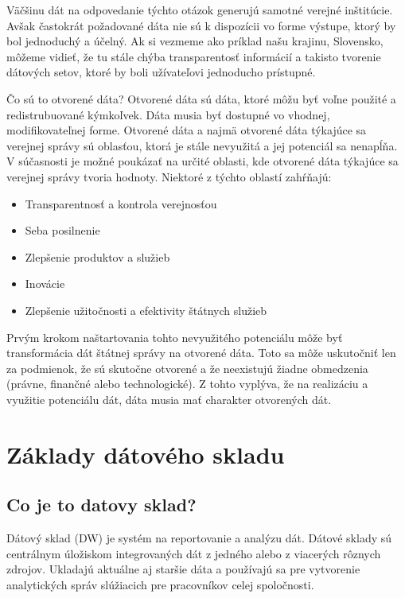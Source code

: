 \documentclass[letterpaper,12pt,oneside]{sphinxmanual}
\begin{document}
Väčšinu dát na odpovedanie týchto otázok generujú samotné verejné inštitúcie. Avšak častokrát požadované
dáta nie sú k dispozícii vo forme výstupe, ktorý by bol jednoduchý a účelný. Ak si vezmeme ako príklad našu krajinu,
Slovensko, môžeme vidieť, že tu stále chýba transparentosť informácií a takisto tvorenie dátových setov, ktoré by boli
užívateľovi jednoducho prístupné.

Čo sú to otvorené dáta? Otvorené dáta sú dáta, ktoré môžu byť voľne použité a redistrubuované kýmkoľvek.
Dáta musia byť dostupné vo vhodnej, modifikovateľnej forme. Otvorené dáta a najmä otvorené dáta týkajúce sa
verejnej správy sú oblasťou, ktorá je stále nevyužitá a jej potenciál sa nenapĺňa. V súčasnosti je možné
poukázať na určité oblasti, kde otvorené dáta týkajúce sa verejnej správy tvoria hodnoty. Niektoré z týchto oblastí zahŕňajú:
\begin{itemize}
\item {} 
Transparentnosť a kontrola verejnosťou

\item {} 
Seba posilnenie

\item {} 
Zlepšenie produktov a služieb

\item {} 
Inovácie

\item {} 
Zlepšenie užitočnosti a efektivity štátnych služieb

\end{itemize}

Prvým krokom naštartovania tohto nevyužitého potenciálu môže byť transformácia dát štátnej správy na otvorené dáta.
Toto sa môže uskutočniť len za podmienok, že sú skutočne otvorené a že neexistujú žiadne obmedzenia (právne, finančné
alebo technologické). Z tohto vyplýva, že na realizáciu a využitie potenciálu dát, dáta musia mať charakter otvorených dát.


\section{Základy dátového skladu}
\label{resume:zaklady-datoveho-skladu}

\subsection{Co je to datovy sklad?}
\label{resume:co-je-to-datovy-sklad}
Dátový sklad (DW) je systém na reportovanie a analýzu dát. Dátové sklady sú centrálnym úložiskom integrovaných dát
z jedného alebo z viacerých rôznych zdrojov. Ukladajú aktuálne aj staršie dáta a používajú sa pre vytvorenie analytických
správ slúžiacich pre pracovníkov celej spoločnosti.
\end{document}
